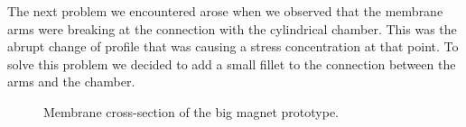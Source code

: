 The next problem we encountered arose when we observed that the membrane arms were breaking at the connection with the cylindrical chamber.
This was the abrupt change of profile that was causing a stress concentration at that point.
To solve this problem we decided to add a small fillet to the connection between the arms and the chamber.
\begin{figure}
    \centering
    \caption{Membrane cross-section of the big magnet prototype.}
    \label{fig: Membrane_v2_section}
\end{figure}